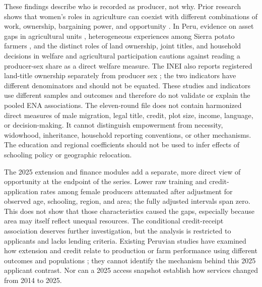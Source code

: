 \documentclass[11pt,a4paper]{article}
\begin{document}
These findings describe who is recorded as producer, not why. Prior research shows that women's roles in agriculture can coexist with different combinations of work, ownership, bargaining power, and opportunity \cite{deere2005,doss2018,kawarazuka2022,leder2022}. In Peru, evidence on asset gaps in agricultural units \cite{delpozo2016}, heterogeneous experiences among Sierra potato farmers \cite{patel2018}, and the distinct roles of land ownership, joint titles, and household decisions in welfare and agricultural participation \cite{schling2024,wiig2013,tobin2022} cautions against reading a producer-sex share as a direct welfare measure. The INEI also reports registered land-title ownership separately from producer sex \cite{ineiods2025}; the two indicators have different denominators and should not be equated. These studies and indicators use different samples and outcomes and therefore do not validate or explain the pooled ENA associations. The eleven-round file does not contain harmonized direct measures of male migration, legal title, credit, plot size, income, language, or decision-making. It cannot distinguish empowerment from necessity, widowhood, inheritance, household reporting conventions, or other mechanisms. The education and regional coefficients should not be used to infer effects of schooling policy or geographic relocation.

The 2025 extension and finance modules add a separate, more direct view of opportunity at the endpoint of the series. Lower raw training and credit-application rates among female producers attenuated after adjustment for observed age, schooling, region, and area; the fully adjusted intervals span zero. This does not show that those characteristics caused the gaps, especially because area may itself reflect unequal resources. The conditional credit-receipt association deserves further investigation, but the analysis is restricted to applicants and lacks lending criteria. Existing Peruvian studies have examined how extension and credit relate to production or farm performance using different outcomes and populations \cite{neves2021,rituay2026}; they cannot identify the mechanism behind this 2025 applicant contrast. Nor can a 2025 access snapshot establish how services changed from 2014 to 2025.
\end{document}
